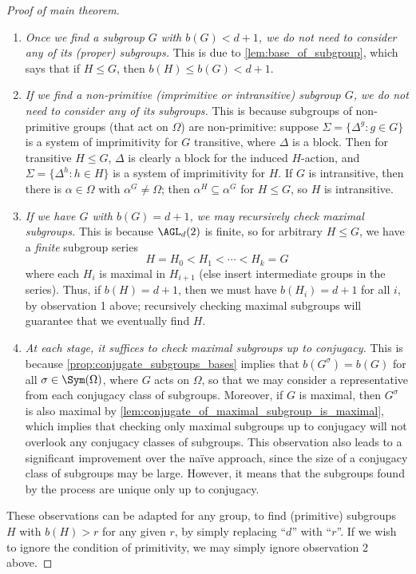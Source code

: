 \begin{proof}[Proof of main theorem]
    \begin{enumerate}
        \item \textit{Once we find a subgroup $G$ with $b(G) < d + 1$, we do not need to consider any of its (proper) subgroups.} This is due to \autoref{lem:base_of_subgroup}, which says that if $H \leq G$, then $b(H) \leq b(G) < d + 1$.
        \item \textit{If we find a non-primitive (imprimitive or intransitive) subgroup $G$, we do not need to consider any of its subgroups.} This is because subgroups of non-primitive groups (that act on $\Omega$) are non-primitive: suppose $\Sigma = \{\Delta^g : g \in G\}$ is a system of imprimitivity for $G$ transitive, where $\Delta$ is a block. Then for transitive $H \leq G$, $\Delta$ is clearly a block for the induced $H$-action, and $\Sigma = \{\Delta^h : h \in H\}$ is a system of imprimitivity for $H$. If $G$ is intransitive, then there is $\alpha \in \Omega$ with $\alpha^G \neq \Omega$; then $\alpha^H \subseteq \alpha^G$ for $H \leq G$, so $H$ is intransitive.
        \item \textit{If we have $G$ with $b(G) = d + 1$, we may recursively check maximal subgroups.} This is because $\AGL_d(2)$ is finite, so for arbitrary $H \leq G$, we have a \textit{finite} subgroup series
              $$H = H_0 < H_1 < \dotsb < H_k = G$$
              where each $H_i$ is maximal in $H_{i + 1}$ (else insert intermediate groups in the series). Thus, if $b(H) = d + 1$, then we must have $b(H_i) = d + 1$ for all $i$, by observation 1 above; recursively checking maximal subgroups will guarantee that we eventually find $H$.
        \item \textit{At each stage, it suffices to check maximal subgroups up to conjugacy.} This is because \autoref{prop:conjugate_subgroups_bases} implies that $b(G^\sigma) = b(G)$ for all $\sigma \in \Sym(\Omega)$, where $G$ acts on $\Omega$, so that we may consider a representative from each conjugacy class of subgroups. Moreover, if $G$ is maximal, then $G^\sigma$ is also maximal by \autoref{lem:conjugate_of_maximal_subgroup_is_maximal}, which implies that checking only maximal subgroups up to conjugacy will not overlook any conjugacy classes of subgroups. This observation also leads to a significant improvement over the na\"ive approach, since the size of a conjugacy class of subgroups may be large. However, it means that the subgroups found by the process are unique only up to conjugacy.
    \end{enumerate}

    These observations can be adapted for any group, to find (primitive) subgroups $H$ with $b(H) > r$ for any given $r$, by simply replacing ``$d$'' with ``$r$''. If we wish to ignore the condition of primitivity, we may simply ignore observation 2 above.


\end{proof}
